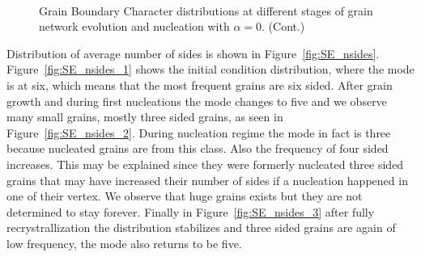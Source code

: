\begin{figure}[ht]\ContinuedFloat
    \centering
    \\
    \caption{Grain Boundary Character distributions at different stages of grain network evolution and nucleation with $\alpha = 0$. (Cont.)}
    \label{fig:SE_gbcd}
\end{figure}

Distribution of average number of sides is shown in Figure~\ref{fig:SE_nsides}. Figure~\ref{fig:SE_nsides_1} shows the initial condition distribution, where the mode is at six, which means that the most frequent grains are six sided. 
After grain growth and during first nucleations the mode changes to five and we observe many small grains, mostly three sided grains, as seen in Figure~\ref{fig:SE_nsides_2}. 
During nucleation regime the mode in fact is three because nucleated grains are from this class. Also the frequency of four sided increases. This may be explained since they were formerly nucleated three sided grains that may have increased their number of sides if a nucleation happened in one of their vertex. We observe that huge grains exists but they are not determined to stay forever. Finally in Figure~\ref{fig:SE_nsides_3} after fully recrystrallization the distribution stabilizes and three sided grains are again of low frequency, the mode also returns to be five.

